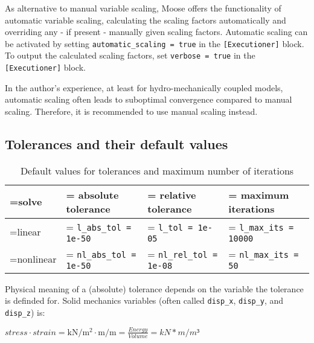 As alternative to manual variable scaling, Moose offers the functionality of
automatic variable scaling, calculating the scaling factors automatically and
overriding any - if present - manually given scaling factors. Automatic scaling
can be activated by setting \texttt{automatic\_scaling = true} in the
\texttt{[Executioner]} block. To output the calculated scaling factors, set
\texttt{verbose = true} in the \texttt{[Executioner]} block.

In the author's experience, at least for hydro-mechanically coupled models,
automatic scaling often leads to suboptimal convergence compared to manual
scaling. Therefore, it is recommended to use manual scaling instead.

\subsection{Tolerances and their default values}

\begin{table}[htbp]
  \centering
  \caption{Default values for tolerances and maximum number of iterations}
  \label{tab:tolerances}
  \begin{tabularx}{\textwidth}{
      >{\hsize\linewidth=\hsize}Y
      >{\hsize\linewidth=\hsize}Y
      >{\hsize\linewidth=\hsize}Y
      >{\hsize\linewidth=\hsize}Y}
    \hline
    solve     & absolute tolerance            & relative tolerance            & maximum iterations \\

    \hline

    linear    & \texttt{l\_abs\_tol = 1e-50}  & \texttt{l\_tol = 1e-05}       &
    \texttt{l\_max\_its = 10000}                                                                   \\

    nonlinear & \texttt{nl\_abs\_tol = 1e-50} & \texttt{nl\_rel\_tol = 1e-08} &
    \texttt{nl\_max\_its = 50}                                                                     \\

    \hline
  \end{tabularx}
\end{table}

Physical meaning of a (absolute) tolerance depends on the variable the
tolerance is definded for. Solid mechanics variables (often called
\texttt{disp\_x}, \texttt{disp\_y}, and \texttt{disp\_z}) is:

$ stress \cdot strain = \unit{\kN\per\m^2} \cdot \unit{\metre\per\metre} = \frac{Energy}{Volume} = kN*m/m³ $

